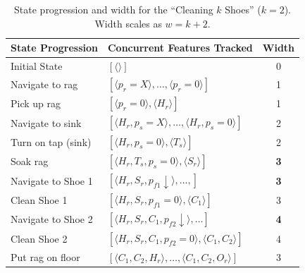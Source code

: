 \begin{table}[t]
\centering
\tiny
\begin{tabularx}{\columnwidth}{l X c}
\toprule
\textbf{State Progression} & \textbf{Concurrent Features Tracked} & \textbf{Width} \\ \midrule
Initial State & $[\langle \rangle]$ & 0 \\
Navigate to rag & $[\langle p_r = X \rangle, \ldots, \langle p_r = 0 \rangle]$ & 1 \\
Pick up rag & $[\langle p_r = 0 \rangle, \langle H_r \rangle]$ & 1 \\
Navigate to sink & $[\langle H_r, p_s = X \rangle, \ldots, \langle H_r, p_s = 0 \rangle]$ & 2 \\
Turn on tap (sink) & $[\langle H_r, p_s = 0  \rangle,  \langle T_s \rangle]$ & 2 \\
Soak rag & $[\langle H_r, T_s, p_s = 0  \rangle, \langle S_r \rangle]$ & \textbf{3} \\
Navigate to Shoe 1 & $[\langle H_r, S_r, p_{f1} \downarrow \rangle, \ldots,] $ & \textbf{3} \\
Clean Shoe 1 & $[\langle H_r, S_r, p_{f1} = 0 \rangle, \langle C_1 \rangle]$ & 3 \\
Navigate to Shoe 2 & $[\langle H_r, S_r, C_1, p_{f2} \downarrow \rangle, \ldots ]$ & \textbf{4} \\
Clean Shoe 2 & $[\langle H_r, S_r, C_1  , p_{f2} = 0 \rangle, \langle C_1, C_2   \rangle]$ & 4 \\
Put rag on floor & $[\langle C_1, C_2, H_r \rangle, \ldots, \langle C_1, C_2, O_r \rangle]$ & 3 \\ \bottomrule
\end{tabularx}
\caption{State progression and width for the ``Cleaning $k$ Shoes'' ($k=2$). Width scales as $w = k+2$.}
\label{tab:task_width_scaling}
\end{table}